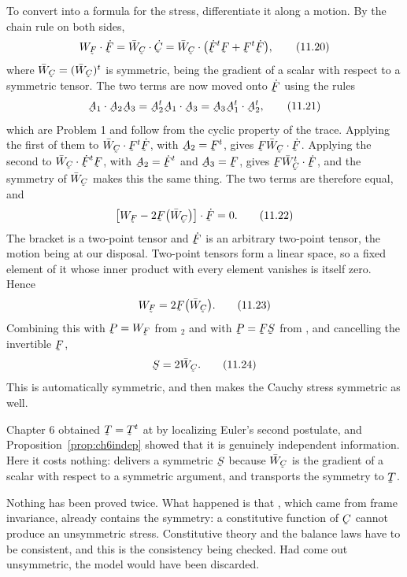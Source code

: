 To convert  into a formula for the stress, differentiate it
along a motion. By the chain rule on both sides,
\begin{equation}
   W_{\bF}\cdot\dot\bF=\bar W_{\bC}\cdot\dot\bC
   =\bar W_{\bC}\cdot\big(\dot\bF^{t}\bF+\bF^{t}\dot\bF\big),
   \tag{11.20}\label{eq:11.20}
\end{equation}
where $\bar W_{\bC}=(\bar W_{\bC})^{t}$ is symmetric, being the gradient
of a scalar with respect to a symmetric tensor. The two terms are now
moved onto $\dot\bF$ using the rules
\begin{equation}
   \bA_{1}\cdot\bA_{2}\bA_{3}=\bA^{t}_{2}\bA_{1}\cdot\bA_{3}
   =\bA_{3}\bA^{t}_{1}\cdot\bA^{t}_{2},
   \tag{11.21}\label{eq:11.21}
\end{equation}
which are Problem 1 and follow from the cyclic property of the trace.
Applying the first of them to $\bar W_{\bC}\cdot\bF^{t}\dot\bF$, with
$\bA_{2}=\bF^{t}$, gives $\bF\bar W_{\bC}\cdot\dot\bF$. Applying the
second to $\bar W_{\bC}\cdot\dot\bF^{t}\bF$, with $\bA_{2}=\dot\bF^{t}$
and $\bA_{3}=\bF$, gives $\bF\bar W^{t}_{\bC}\cdot\dot\bF$, and the
symmetry of $\bar W_{\bC}$ makes this the same thing. The two terms are
therefore equal, and
\begin{equation}
   \big[W_{\bF}-2\bF\big(\bar W_{\bC}\big)\big]\cdot\dot\bF=0 .
   \tag{11.22}\label{eq:11.22}
\end{equation}
The bracket is a two-point tensor and $\dot\bF$ is an arbitrary
two-point tensor, the motion being at our disposal. Two-point tensors
form a linear space, so a fixed element of it whose inner product with
every element vanishes is itself zero. Hence
\begin{equation}
   W_{\bF}=2\bF\big(\bar W_{\bC}\big).
   \tag{11.23}\label{eq:11.23}
\end{equation}
Combining this with $\bP=W_{\bF}$ from $_{2}$ and with
$\bP=\bF\bS$ from , and cancelling the invertible $\bF$,
\begin{equation}
   \bS=2\bar W_{\bC} .
   \tag{11.24}\label{eq:11.24}
\end{equation}
This is automatically symmetric, and  then makes the Cauchy
stress symmetric as well.

\begin{remark}%
\label{rem:ch11free}
Chapter 6 obtained $\bT=\bT^{t}$ at  by localizing Euler's
second postulate, and Proposition~\ref{prop:ch6indep} showed that it is
genuinely independent information. Here it costs nothing: 
delivers a symmetric $\bS$ because $\bar W_{\bC}$ is the gradient of a
scalar with respect to a symmetric argument, and  transports
the symmetry to $\bT$.

Nothing has been proved twice. What happened is that , which
came from frame invariance, already contains the symmetry: a constitutive
function of $\bC$ cannot produce an unsymmetric stress. Constitutive
theory and the balance laws have to be consistent, and this is the
consistency being checked. Had  come out unsymmetric, the
model would have been discarded.
\end{remark}

